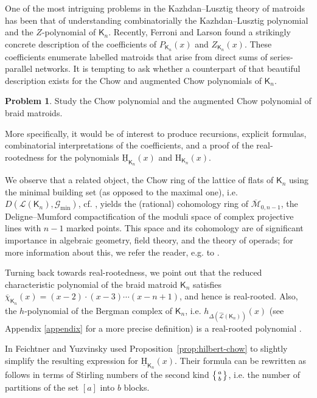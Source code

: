 \documentclass[11pt, a4paper, english]{amsart}
\newcommand{\tstirlingtwo}[2]{\left\{\genfrac{}{}{0pt}{}{#1}{#2}\right\}}
\theoremstyle{teoremas}
\theoremstyle{definition}
\newtheorem{problem}[theorem]{Problem}
\renewcommand{\H}{\mathrm{H}}
\newcommand{\uH}{\underline{\mathrm{H}}}
\begin{document}
One of the most intriguing problems in the Kazhdan--Lusztig theory of matroids has been that of understanding combinatorially the Kazhdan--Lusztig polynomial and the $Z$-polynomial of $\mathsf{K}_n$. Recently, Ferroni and Larson \cite{ferroni-larson} found a strikingly concrete description of the coefficients of $P_{\mathsf{K}_n}(x)$ and $Z_{\mathsf{K}_n}(x)$. These coefficients enumerate labelled matroids that arise from direct sums of series-parallel networks. It is tempting to ask whether a counterpart of that beautiful description exists for the Chow and augmented Chow polynomials of $\mathsf{K}_n$.

\begin{problem}
    Study the Chow polynomial and the augmented Chow polynomial of braid matroids.
\end{problem}

More specifically, it would be of interest to produce recursions, explicit formulas, combinatorial interpretations of the coefficients, and a proof of the real-rootedness for the polynomials $\uH_{\mathsf{K}_n}(x)$ and $\H_{\mathsf{K}_n}(x)$.

We observe that a related object, the Chow ring of the lattice of flats of $\mathsf{K}_n$ using the minimal building set (as opposed to the maximal one), i.e. $D(\mathcal{L}(\mathsf{K}_n),\mathcal{G}_{\min})$, cf. \cite[Example 1]{feichtner-yuzvinsky}, yields the (rational) cohomology ring of $\overline{\mathcal{M}}_{0,n-1}$, the Deligne--Mumford compactification
of the moduli space of complex projective lines with $n-1$ marked points. This space and its cohomology are of significant importance in algebraic geometry, field theory, and the theory of operads; for more information about this, we refer the reader, e.g. to \cite{ginzburg-kapranov,kontsevich,etingof-henriques-kamnitzer-rains,dotsenko}.

Turning back towards real-rootedness, we point out that the reduced characteristic polynomial of the braid matroid $\mathsf{K}_n$ satisfies $\overline{\chi}_{\mathsf{K}_n}(x) = (x-2)\cdot (x-3)\cdots (x-n+1)$, and hence is real-rooted. Also, the $h$-polynomial of the Bergman complex of $\mathsf{K}_n$, i.e. $h_{\Delta(\widehat{\mathcal{L}}(\mathsf{K}_n))}(x)$ (see Appendix \ref{appendix} for a more precise definition) is a real-rooted polynomial \cite[Proposition~4.2]{athanasiadis-kalampogia}. 

In \cite[p.~527]{feichtner-yuzvinsky} Feichtner and Yuzvinsky used Proposition~\ref{prop:hilbert-chow} to slightly simplify the resulting expression for $\uH_{\mathsf{K}_n}(x)$. Their formula can be rewritten as follows in terms of Stirling numbers of the second kind $\tstirlingtwo{a}{b}$, i.e. the number of partitions of the set $[a]$ into $b$ blocks.
\end{document}
